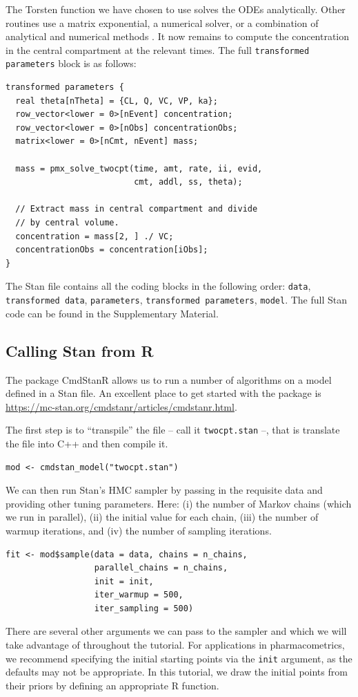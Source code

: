 The Torsten function we have chosen to use solves the ODEs analytically.
Other routines use a matrix exponential, a numerical solver, or a combination of analytical and numerical methods \cite{Margossian:2017}.
It now remains to compute the concentration in the central compartment at the relevant times.
The full \texttt{transformed parameters} block is as follows:
\begin{lstlisting}
transformed parameters {
  real theta[nTheta] = {CL, Q, VC, VP, ka};
  row_vector<lower = 0>[nEvent] concentration;
  row_vector<lower = 0>[nObs] concentrationObs;
  matrix<lower = 0>[nCmt, nEvent] mass;

  mass = pmx_solve_twocpt(time, amt, rate, ii, evid, 
                          cmt, addl, ss, theta);

  // Extract mass in central compartment and divide 
  // by central volume.
  concentration = mass[2, ] ./ VC;
  concentrationObs = concentration[iObs];
}  
\end{lstlisting} 

The Stan file contains all the coding blocks in the following order: \texttt{data}, \texttt{transformed data}, \texttt{parameters}, \texttt{transformed parameters}, \texttt{model}.
The full Stan code can be found in the Supplementary Material.

\subsection{Calling Stan from R}

The package CmdStanR allows us to run a number of algorithms on a model defined in a Stan file.
An excellent place to get started with the package is \url{https://mc-stan.org/cmdstanr/articles/cmdstanr.html}.

The first step is to ``transpile'' the file -- call it \texttt{twocpt.stan} --, that is translate the file into C++ and then compile it.
\begin{lstlisting}
mod <- cmdstan_model("twocpt.stan")
\end{lstlisting}
%
We can then run Stan's HMC sampler by passing in the requisite data and providing other tuning parameters.
Here: (i) the number of Markov chains (which we run in parallel), (ii) the initial value for each chain, (iii) the number of warmup iterations, and (iv) the number of sampling iterations.
\begin{lstlisting}
fit <- mod$sample(data = data, chains = n_chains,
                  parallel_chains = n_chains,
                  init = init,
                  iter_warmup = 500, 
                  iter_sampling = 500)
\end{lstlisting}
%
There are several other arguments we can pass to the sampler and which we will take advantage of throughout the tutorial.
For applications in pharmacometrics, we recommend specifying the initial starting points via the \texttt{init} argument, as the defaults may not be appropriate.
In this tutorial, we draw the initial points from their priors by defining an appropriate R function.

